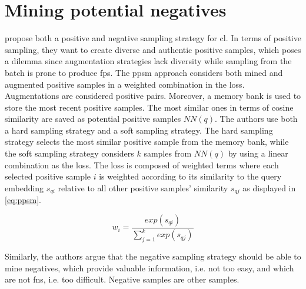 \section{Mining potential negatives}\label{sec:mining_potential_negatives}

\citet{mining_potential_2024} propose both a positive and negative sampling strategy for \ac{cl}.
In terms of positive sampling, they want to create diverse and authentic positive samples, 
which poses a dilemma since augmentation strategies lack diversity while sampling from the batch is prone to produce \acp{fp}.
The \ac{ppsm} approach considers both mined and augmented positive samples in a weighted combination in the loss.
Augmentations are considered positive pairs.
Moreover, a memory bank is used to store the most recent positive samples.
The most similar ones in terms of cosine similarity are saved as potential positive samples $NN(q)$.%
The authors use both a hard sampling strategy and a soft sampling strategy.
The hard sampling strategy selects the most similar positive sample from the memory bank, 
while the soft sampling strategy considers $k$ samples from $NN(q)$ by using a linear combination as the loss.
The loss is composed of weighted terms where each selected positive sample $i$ is weighted 
according to its similarity to the query embedding $s_{qi}$ relative to all other positive samples' similarity $s_{qj}$ as displayed in \eqref{eq:ppsm}.

\begin{equation}
    w_i = \frac{exp(s_{qi})}{\sum_{j=1}^{k}exp(s_{qj})}
    \label{eq:ppsm}
\end{equation}

Similarly, the authors argue that the negative sampling strategy should be able to mine negatives, 
which provide valuable information, i.e. not too easy, and which are not \acp{fn}, i.e. too difficult.
Negative samples are other samples.
